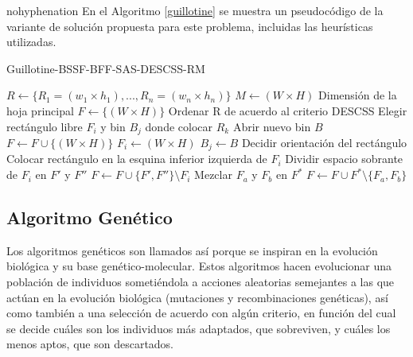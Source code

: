 \documentclass[a4paper,10pt,twocolumn]{article}
\begin{document}
\begin{hyphenrules}{nohyphenation}
En el Algoritmo \ref{guillotine} se muestra un pseudocódigo de la variante de solución propuesta para este problema, incluidas las heurísticas utilizadas. 

 
\algrenewcommand{}
\begin{algorithm}
\caption{Guillotine-BSSF-BFF-SAS-DESCSS-RM}\label{guillotine}
\begin{algorithmic}[1]
	\Require $R \gets \{ R_1 = (w_1 \times h_1), ..., R_n = (w_n \times h_n) \}$ $ M \gets (W \times H)$ \Comment Dimensión de la hoja principal
	\State $F \gets \{(W \times H)\}$
	\State Ordenar R de acuerdo al criterio DESCSS
		\State Elegir rectángulo libre $F_i$ y bin $B_j$ donde colocar $R_k$
			\State Abrir nuevo bin $B$
			\State $F \gets F \cup \{(W \times H)\}$
			\State $F_i \gets (W \times H)$
			\State $B_j \gets B$ 
		\EndIf
		\State Decidir orientación del rectángulo
		\State Colocar rectángulo en la esquina inferior izquierda de $F_i$
		\State Dividir espacio sobrante de $F_i$ en $F'$ y $F''$
		\State $F \gets F \cup \{F', F''\} \setminus F_i $
			\State Mezclar $F_a$ y $F_b$ en $F^*$
			\State $F \gets F \cup F^* \setminus \{F_a, F_b\}  $
		\EndWhile
	\EndFor
\end{algorithmic}
\end{algorithm}


\subsection{Algoritmo Genético}

Los algoritmos genéticos son llamados así porque se inspiran en la evolución biológica y su base genético-molecular. Estos algoritmos hacen evolucionar una población de individuos sometiéndola a acciones aleatorias semejantes a las que actúan en la evolución biológica (mutaciones y recombinaciones genéticas), así como también a una selección de acuerdo con algún criterio, en función del cual se decide cuáles son los individuos más adaptados, que sobreviven, y cuáles los menos aptos, que son descartados.\cite{5}


\end{hyphenrules}
\end{document}
